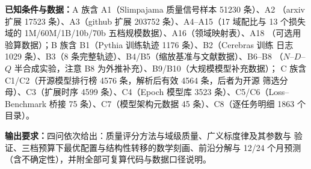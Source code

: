 \textbf{已知条件与数据：}A 族含 A1（Slimpajama 质量信号样本 51230 条）、A2
（arxiv 扩展 17523 条）、A3（github 扩展 203752 条）、A4--A15（17 域配比与
13 个损失域的 1M/60M/1B/10b/70b 五档规模数据）、A16（领域映射表）、A18
（可选用验算数据）；B 族含 B1（Pythia 训练轨迹 1176 条）、B2（Cerebras 训练
日志 1029 条）、B3（8 条完整轨迹）、B4/B5（缩放基准与文献数据）、B6--B8
（$N$--$D$--$Q$ 半合成实验，注意 B8 为外推补充）、B9/B10（大规模模型补充数据）；
C 族含 C1/C2（开源模型排行榜 4576 条，解析后有效 4564 条，后者为开源
筛选分母）、C3（扩展时序 4599 条）、C4（Epoch
模型库 3523 条）、C5/C6（Loss--Benchmark 桥接 75 条）、C7（模型架构元数据
45 条）、C8（逐任务明细 1863 个目录）。

\textbf{输出要求：}四问依次给出：质量评分方法与域级质量、广义标度律及其参数与
验证、三档预算下最优配置与结构性转移的数学刻画、前沿分解与 12/24 个月预测
（含不确定性），并附全部可复算代码与数据口径说明。

